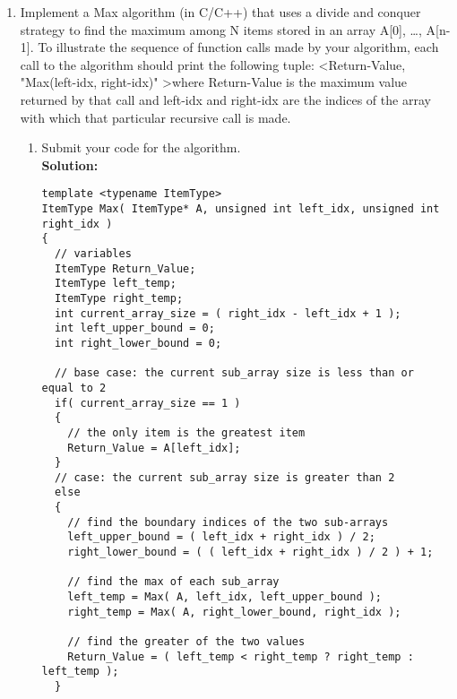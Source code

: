 \documentclass[11pts]{article}
\begin{document}
\begin{enumerate}
\item Implement a Max algorithm (in C/C++) that uses a divide and conquer
strategy to find the maximum among N items stored in an array
A[0], \dots, A[n-1]. To illustrate the sequence of function calls made
by your algorithm, each call to the algorithm should print the
following tuple: \textless Return-Value, "Max(left-idx,
right-idx)" \textgreater where Return-Value
is the maximum value returned by that call and left-idx and
right-idx are the indices of the array with which that particular
recursive call is made.

  \begin{enumerate}
  \item Submit your code for the algorithm. \\

  \textbf{Solution:}
    \begin{verbatim}
template <typename ItemType>
ItemType Max( ItemType* A, unsigned int left_idx, unsigned int right_idx )
{
  // variables
  ItemType Return_Value;
  ItemType left_temp;
  ItemType right_temp;
  int current_array_size = ( right_idx - left_idx + 1 );
  int left_upper_bound = 0;
  int right_lower_bound = 0;

  // base case: the current sub_array size is less than or equal to 2
  if( current_array_size == 1 )
  {
    // the only item is the greatest item
    Return_Value = A[left_idx];
  }
  // case: the current sub_array size is greater than 2
  else
  {
    // find the boundary indices of the two sub-arrays
    left_upper_bound = ( left_idx + right_idx ) / 2;
    right_lower_bound = ( ( left_idx + right_idx ) / 2 ) + 1;

    // find the max of each sub_array
    left_temp = Max( A, left_idx, left_upper_bound );
    right_temp = Max( A, right_lower_bound, right_idx );

    // find the greater of the two values
    Return_Value = ( left_temp < right_temp ? right_temp : left_temp );
  }


\end{verbatim}
\end{enumerate}
\end{enumerate}
\end{document}
